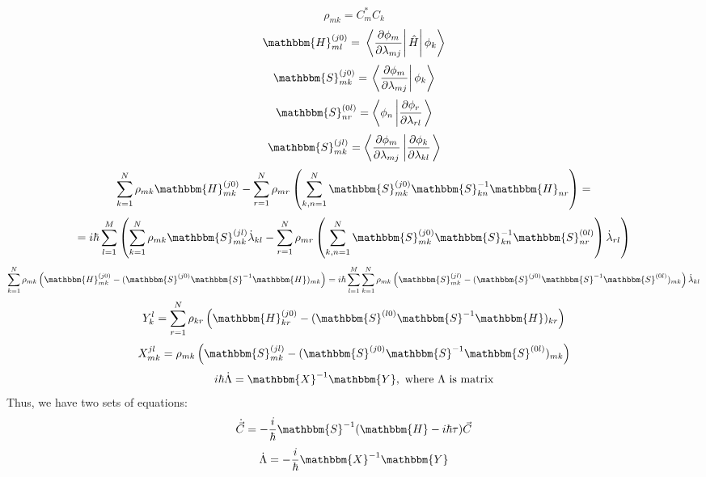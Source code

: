 $$\rho_{mk} = C_m^*C_k$$
$$\mathbbm{H}_{ml}^{(j0)}=\left.\left.\left\langle\frac{\partial\phi_m}{\partial\lambda_{mj}}\right|\hat{H}\right|\phi_k\right\rangle$$
$$\mathbbm{S}_{mk}^{(j0)}=\left.\left\langle\frac{\partial\phi_m}{\partial\lambda_{mj}}\right|\phi_k\right\rangle$$
$$\mathbbm{S}_{nr}^{(0l)}=\left\langle\phi_n\left|\frac{\partial\phi_r}{\partial\lambda_{rl}}\right.\right\rangle$$
$$\mathbbm{S}_{mk}^{(jl)}=\left\langle\frac{\partial\phi_m}{\partial\lambda_{mj}}\left|%
				 \frac{\partial\phi_k}{\partial\lambda_{kl}}\right.\right\rangle$$
$$\sum_{k=1}^N\rho_{mk}\mathbbm{H}_{mk}^{(j0)}-%
  \sum_{r=1}^N\rho_{mr}\left(\sum_{k,n=1}^N\mathbbm{S}_{mk}^{(j0)}\mathbbm{S}_{kn}^{-1}\mathbbm{H}_{nr}\right)=$$
$$=i\hbar\sum_{l=1}^M\left(\sum_{k=1}^N\rho_{mk}\mathbbm{S}_{mk}^{(jl)}\dot{\lambda}_{kl}-%
\sum_{r=1}^N\rho_{mr}\left(\sum_{k,n=1}^{N}\mathbbm{S}_{mk}^{(j0)}\mathbbm{S}_{kn}^{-1}\mathbbm{S}_{nr}^{(0l)}\right)\dot{\lambda}_{rl}\right)$$
$$\sum_{k=1}^N\rho_{mk}\left(\mathbbm{H}_{mk}^{(j0)}-%
	                     (\mathbbm{S}^{(j0)}\mathbbm{S}^{-1}\mathbbm{H})_{mk} \right)=%
i\hbar\sum_{l=1}^M\sum_{k=1}^N\rho_{mk}\left(\mathbbm{S}_{mk}^{(jl)}-%
					     (\mathbbm{S}^{(j0)}\mathbbm{S}^{-1}\mathbbm{S}^{(0l)})_{mk}\right)\dot{\lambda}_{kl}$$
$$Y_{k}^l=\sum_{r=1}^N\rho_{kr}\left(\mathbbm{H}_{kr}^{(j0)}-%
	                     (\mathbbm{S}^{(l0)}\mathbbm{S}^{-1}\mathbbm{H})_{kr} \right)$$
$$X_{mk}^{jl}=\rho_{mk}\left(\mathbbm{S}_{mk}^{(jl)}-%
					     (\mathbbm{S}^{(j0)}\mathbbm{S}^{-1}\mathbbm{S}^{(0l)})_{mk}\right)$$
$$i\hbar\dot{\Lambda} = \mathbbm{X}^{-1}\mathbbm{Y},\text{ where }\Lambda\text{ is matrix}$$
Thus, we have two sets of equations:
$$\dot{\vec{C}} = -\frac{i}{\hbar}\mathbbm{S}^{-1}(\mathbbm{H}-i\hbar\tau)\vec{C}$$
$$\dot{\Lambda} = -\frac{i}{\hbar}\mathbbm{X}^{-1}\mathbbm{Y}$$

